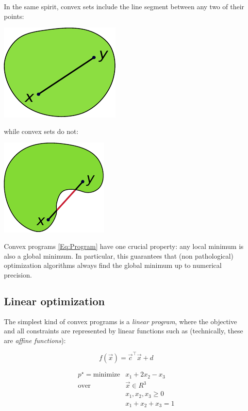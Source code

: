 \documentclass[11pt]{article}
\makeatletter
\def\maxwidth{\ifdim\Gin@nat@width>\linewidth\linewidth
    \else\Gin@nat@width\fi}
\let\Oldincludegraphics\includegraphics
\renewcommand{\includegraphics}[1]{\Oldincludegraphics[width=.8\maxwidth]{#1}}
\makeatother
\begin{document}
In the same spirit, convex sets include the line segment between any two
of their points:

\includegraphics{Convex_polygon_illustration1.pdf}

while convex sets do not:

\includegraphics{Convex_polygon_illustration2.pdf}

Convex programs \eqref{Eq:Program} have one crucial property: any local
minimum is also a global minimum. In particular, this guarantees that
(non pathological) optimization algorithms always find the global
minimum up to numerical precision.

\subsection{Linear optimization}\label{linear-optimization}

The simplest kind of convex programs is a \emph{linear program}, where
the objective and all constraints are represented by linear functions
such as (technically, these are \emph{affine functions}):

\begin{equation}
f(\vec{x}) = \vec{c}^\top \vec{x} + d
\end{equation}

\begin{equation}
\label{Eq:LPExample}
  \begin{array}{rl}
    p^\star = \text{minimize} & x_1 + 2 x_2 - x_3 \\
    \text{over} & \vec{x} \in R^3 \\
    & x_1, x_2, x_3 \ge 0 \\
    & x_1 + x_2 + x_3 = 1
  \end{array}
\end{equation}
\end{document}
